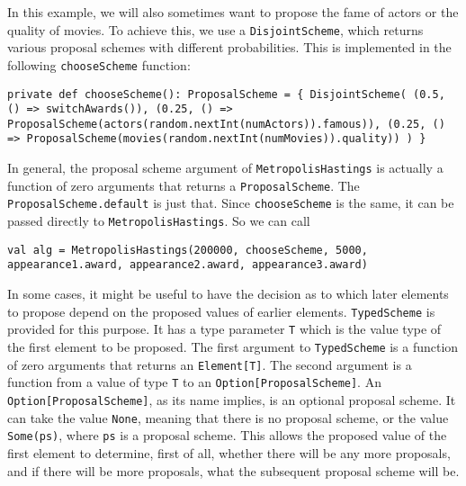 In this example, we will also sometimes want to propose the fame of actors or the quality of movies. To achieve this, we use a \texttt{Disjoint\-Scheme}, which returns various proposal schemes with different probabilities. This is implemented in the following \texttt{chooseScheme} function:

\begin{flushleft}
\texttt{private def chooseScheme(): ProposalScheme = \{ 
\newline \tab DisjointScheme(
\newline \tab (0.5, () => switchAwards()), 
\newline \tab (0.25, () => 
\newline \tab ProposalScheme(actors(random.nextInt(numActors)).famous)), 
\newline \tab (0.25, () =>
\newline \tab ProposalScheme(movies(random.nextInt(numMovies)).quality))
\newline )
\newline \}
}
\end{flushleft}

In general, the proposal scheme argument of \texttt{MetropolisHastings} is actually a function of zero arguments that returns a \texttt{ProposalScheme}. The \texttt{ProposalScheme.default} is just that. Since \texttt{chooseScheme} is the same, it can be passed directly to \texttt{MetropolisHastings}. So we can call

\begin{flushleft}
\texttt{val alg =
\newline \tab MetropolisHastings(200000, chooseScheme, 5000, appearance1.award, appearance2.award, appearance3.award) }
\end{flushleft}

In some cases, it might be useful to have the decision as to which later elements to propose depend on the proposed values of earlier elements. \texttt{TypedScheme} is provided for this purpose. It has a type parameter \texttt{T} which is the value type of the first element to be proposed. The first argument to \texttt{TypedScheme} is a function of zero arguments that returns an \texttt{Element[T]}. The second argument is a function from a value of type \texttt{T} to an \texttt{Option[ProposalScheme]}. An \texttt{Option[Proposal\-Scheme]}, as its name implies, is an optional proposal scheme. It can take the value \texttt{None}, meaning that there is no proposal scheme, or the value \texttt{Some(ps)}, where \texttt{ps} is a proposal scheme. This allows the proposed value of the first element to determine, first of all, whether there will be any more proposals, and if there will be more proposals, what the subsequent proposal scheme will be.

